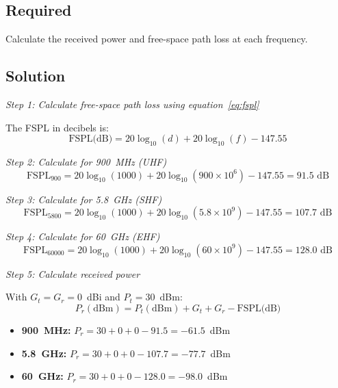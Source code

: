 \subsection*{Required}

Calculate the received power and free-space path loss at each frequency.

\subsection*{Solution}

\textit{Step 1: Calculate free-space path loss using equation~\ref{eq:fspl}}

The FSPL in decibels is:
\begin{equation}
\text{FSPL(dB)} = 20\log_{10}(d) + 20\log_{10}(f) - 147.55
\label{eq:fspl}
\end{equation}

\textit{Step 2: Calculate for 900~MHz (UHF)}
\begin{equation}
\text{FSPL}_{900} = 20\log_{10}(1000) + 20\log_{10}(900 \times 10^6) - 147.55 = 91.5 \text{ dB}
\end{equation}

\textit{Step 3: Calculate for 5.8~GHz (SHF)}
\begin{equation}
\text{FSPL}_{5800} = 20\log_{10}(1000) + 20\log_{10}(5.8 \times 10^9) - 147.55 = 107.7 \text{ dB}
\end{equation}

\textit{Step 4: Calculate for 60~GHz (EHF)}
\begin{equation}
\text{FSPL}_{60000} = 20\log_{10}(1000) + 20\log_{10}(60 \times 10^9) - 147.55 = 128.0 \text{ dB}
\end{equation}

\textit{Step 5: Calculate received power}

With $G_t = G_r = 0$~dBi and $P_t = 30$~dBm:
\begin{equation}
P_r(\text{dBm}) = P_t(\text{dBm}) + G_t + G_r - \text{FSPL(dB)}
\end{equation}

\begin{itemize}
\item \textbf{900~MHz:} $P_r = 30 + 0 + 0 - 91.5 = -61.5$~dBm
\item \textbf{5.8~GHz:} $P_r = 30 + 0 + 0 - 107.7 = -77.7$~dBm
\item \textbf{60~GHz:} $P_r = 30 + 0 + 0 - 128.0 = -98.0$~dBm
\end{itemize}

